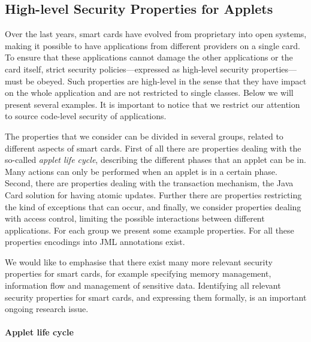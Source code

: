 \subsection{High-level Security Properties for Applets}  \label{SecHighLevelSecProp}


Over the last years, smart cards have evolved from proprietary into
open systems, making it possible to have applications from different
providers on a single card. To ensure that these applications cannot
damage the other applications or the card itself, strict security
policies---expressed as high-level security properties---must be
obeyed.  Such properties are high-level in the sense that they have
impact on the whole application and are not restricted to single
classes. Below we will present several examples. It is important to
notice that we restrict our attention to source code-level security of
applications.

The properties that we consider can be divided in several groups,
related to different aspects of smart cards. First of all there are
properties dealing with the so-called \emph{applet life cycle},
describing the different phases that an applet can be in. Many actions
can only be performed when an applet is in a certain phase. Second,
there are properties dealing with the transaction mechanism, the Java
Card solution for having atomic updates. Further there are properties
restricting the kind of exceptions that can occur, and finally, we
consider properties dealing with access control, limiting the possible
interactions between different applications. For each group we present
some example properties. For all these properties encodings into JML
annotations exist.

We would like to emphasise that there exist many more
relevant security properties for smart cards, for example specifying
memory management, information flow and management of sensitive
data. Identifying all relevant security properties for smart cards,
and expressing them formally, is an important ongoing research issue.
 

\paragraph {Applet life cycle}

